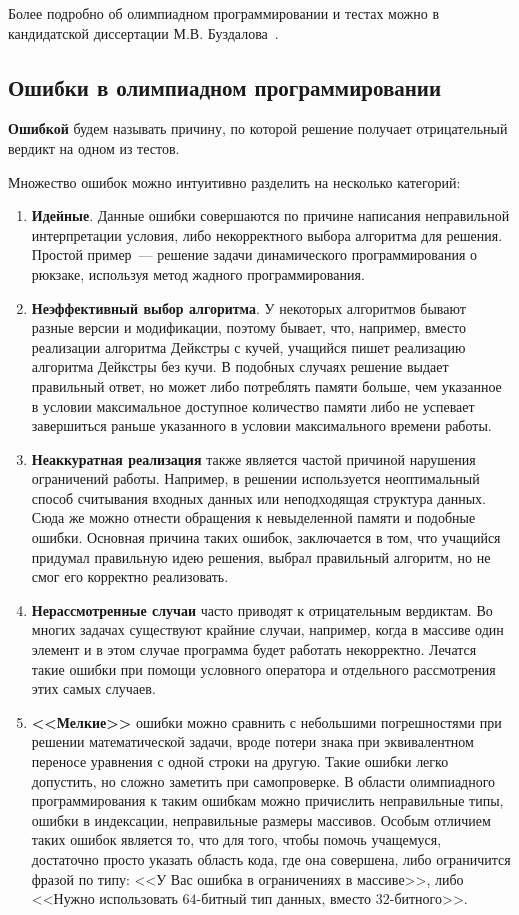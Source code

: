 Более подробно об олимпиадном программировании и тестах можно в кандидатской 
диссертации М.В. Буздалова~\cite{buzdalov-diss}.

\subsection{Ошибки в олимпиадном программировании}


\textbf{Ошибкой} будем называть причину, по которой решение получает отрицательный вердикт на одном из тестов.

Множество ошибок можно интуитивно разделить на несколько категорий:
\begin{enumerate}
    \item \textbf{Идейные}. Данные ошибки совершаются по причине написания неправильной интерпретации условия,
        либо некорректного выбора алгоритма для решения. Простой пример~--- решение задачи динамического программирования 
        о рюкзаке, используя метод жадного программирования. 
    \item \textbf{Неэффективный выбор алгоритма}. У некоторых алгоритмов бывают разные версии и модификации,
        поэтому бывает, что, например, вместо реализации алгоритма Дейкстры с кучей, учащийся пишет 
        реализацию алгоритма Дейкстры без кучи. В подобных случаях решение выдает правильный ответ, но может
        либо потреблять памяти больше, чем указанное в условии максимальное доступное количество памяти
        либо не успевает завершиться раньше указанного в условии максимального времени работы.
    \item \textbf{Неаккуратная реализация} также является частой причиной нарушения ограничений работы.
        Например, в решении используется неоптимальный способ считывания входных данных или неподходящая
        структура данных. Сюда же можно отнести обращения к невыделенной памяти и подобные ошибки.
        Основная причина таких ошибок, заключается в том, что учащийся придумал правильную идею решения, 
        выбрал правильный алгоритм, но не смог его корректно реализовать.  
    \item \textbf{Нерассмотренные случаи} часто приводят к отрицательным вердиктам. Во многих задачах существуют крайние случаи,
        например, когда в массиве один элемент и в этом случае программа будет работать некорректно. Лечатся такие ошибки при помощи
        условного оператора и отдельного рассмотрения этих самых случаев.
    \item \textbf{<<Мелкие>>} ошибки можно сравнить с небольшими погрешностями при решении математической задачи, 
        вроде потери знака при эквивалентном переносе уравнения с одной строки на другую.
        Такие ошибки легко допустить, но сложно заметить при самопроверке. В области олимпиадного программирования к таким ошибкам
        можно причислить неправильные типы, ошибки в индексации, неправильные размеры массивов. Особым отличием таких ошибок
        является то, что для того, чтобы помочь учащемуся, достаточно просто указать область кода, где она совершена, либо
        ограничится фразой по типу: <<У Вас ошибка в ограничениях в массиве>>, либо <<Нужно использовать 
        $64$-битный тип данных, вместо $32$-битного>>.   
\end{enumerate}


